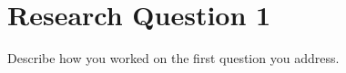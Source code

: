 \section{Research Question 1} \label{question1}  %

Describe how you worked on the first question you address.

\blindtext
